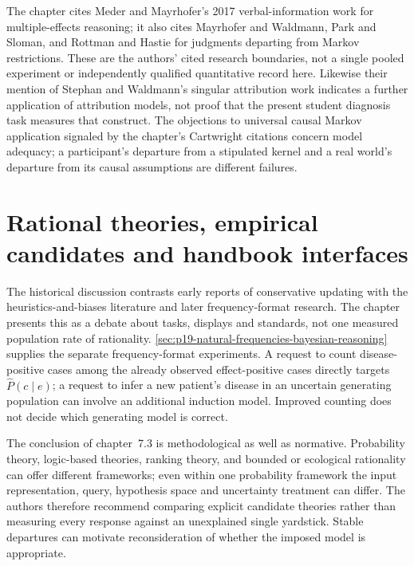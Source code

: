 The chapter cites Meder and Mayrhofer's 2017 verbal-information work for
multiple-effects reasoning; it also cites Mayrhofer and Waldmann,
Park and Sloman, and Rottman and Hastie for judgments departing from
Markov restrictions. These are the authors' cited research boundaries,
not a single pooled experiment or independently qualified quantitative
record here. Likewise their mention of Stephan and Waldmann's singular
attribution work indicates a further application of attribution models,
not proof that the present student diagnosis task measures that construct.
The objections to universal causal Markov application signaled by the
chapter's Cartwright citations concern model adequacy; a participant's
departure from a stipulated kernel and a real world's departure from its
causal assumptions are different failures.
\cite[secs.~3--4, pp.~452--453]{MederMayrhofer2021DiagnosticCausal}

\section{Rational theories, empirical candidates and handbook interfaces}
\label{sec:p19-rat73-rationality}

The historical discussion contrasts early reports of conservative updating
with the heuristics-and-biases literature and later frequency-format
research. The chapter presents this as a debate about tasks, displays
and standards, not one measured population rate of rationality.
\cref{sec:p19-natural-frequencies-bayesian-reasoning} supplies the separate
frequency-format experiments. A request to count disease-positive cases
among the already observed effect-positive cases directly targets
\(\widehat P(c\mid e)\); a request to infer a new patient's disease
in an uncertain generating population can involve an additional induction
model. Improved counting does not decide which generating model is correct.
\cite[sec.~2.1, pp.~449--450]{MederMayrhofer2021DiagnosticCausal}

The conclusion of chapter~7.3 is methodological as well as normative.
Probability theory, logic-based theories, ranking theory, and bounded or
ecological rationality can offer different frameworks; even within one
probability framework the input representation, query, hypothesis space
and uncertainty treatment can differ. The authors therefore recommend
comparing explicit candidate theories rather than measuring every response
against an unexplained single yardstick. Stable departures can motivate
reconsideration of whether the imposed model is appropriate.
\cite[sec.~5, pp.~453--454]{MederMayrhofer2021DiagnosticCausal}

